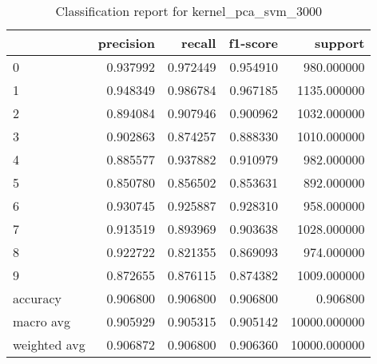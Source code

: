 \begin{table}[htb!]
\centering
\caption{Classification report for kernel_pca_svm_3000}
\label{tab:classification-report-kernel_pca_svm_3000}
\begin{tabular}{lrrrr}
\toprule
 & precision & recall & f1-score & support \\
\midrule
0 & 0.937992 & 0.972449 & 0.954910 & 980.000000 \\
1 & 0.948349 & 0.986784 & 0.967185 & 1135.000000 \\
2 & 0.894084 & 0.907946 & 0.900962 & 1032.000000 \\
3 & 0.902863 & 0.874257 & 0.888330 & 1010.000000 \\
4 & 0.885577 & 0.937882 & 0.910979 & 982.000000 \\
5 & 0.850780 & 0.856502 & 0.853631 & 892.000000 \\
6 & 0.930745 & 0.925887 & 0.928310 & 958.000000 \\
7 & 0.913519 & 0.893969 & 0.903638 & 1028.000000 \\
8 & 0.922722 & 0.821355 & 0.869093 & 974.000000 \\
9 & 0.872655 & 0.876115 & 0.874382 & 1009.000000 \\
accuracy & 0.906800 & 0.906800 & 0.906800 & 0.906800 \\
macro avg & 0.905929 & 0.905315 & 0.905142 & 10000.000000 \\
weighted avg & 0.906872 & 0.906800 & 0.906360 & 10000.000000 \\
\bottomrule
\end{tabular}
\end{table}
